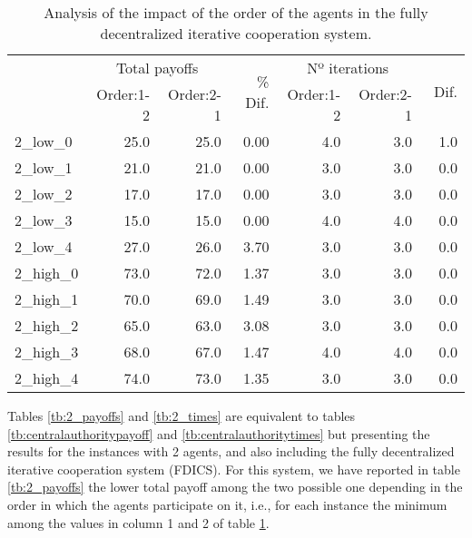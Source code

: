 \documentclass{article}
\begin{document}
\begin{table}[ht!]
\centering
\caption{Analysis of the impact of the order of the agents in the fully decentralized iterative cooperation system. \label{tb:iter_order_comparition}}
\begin{adjustbox}{max width=\textwidth}
\begin{tabular}{lrrrrrr}
\toprule
{} & \multicolumn{2}{c}{Total payoffs} & \multirow{2}{*}{\% Dif.} & \multicolumn{2}{c}{Nº iterations} & \multirow{2}{*}{\ Dif.} \\
{} &  Order:1-2 &  Order:2-1 &       &  Order:1-2 &  Order:2-1 & \\
\midrule
2\_low\_0  &           25.0 &           25.0 &  0.00 &        4.0 &        3.0 &     1.0 \\
2\_low\_1  &           21.0 &           21.0 &  0.00 &        3.0 &        3.0 &     0.0 \\
2\_low\_2  &           17.0 &           17.0 &  0.00 &        3.0 &        3.0 &     0.0 \\
2\_low\_3  &           15.0 &           15.0 &  0.00 &        4.0 &        4.0 &     0.0 \\
2\_low\_4  &           27.0 &           26.0 &  3.70 &        3.0 &        3.0 &     0.0 \\
2\_high\_0 &           73.0 &           72.0 &  1.37 &        3.0 &        3.0 &     0.0 \\
2\_high\_1 &           70.0 &           69.0 &  1.49 &        3.0 &        3.0 &     0.0 \\
2\_high\_2 &           65.0 &           63.0 &  3.08 &        3.0 &        3.0 &     0.0 \\
2\_high\_3 &           68.0 &           67.0 &  1.47 &        4.0 &        4.0 &     0.0 \\
2\_high\_4 &           74.0 &           73.0 &  1.35 &        3.0 &        3.0 &     0.0 \\
\bottomrule
\end{tabular}
\end{adjustbox}
\end{table}


Tables \ref{tb:2_payoffs} and \ref{tb:2_times} are equivalent to tables \ref{tb:centralauthoritypayoff} and \ref{tb:centralauthoritytimes} but presenting the results for the instances with 2 agents, and also including the fully decentralized iterative cooperation system (FDICS). For this system, we have reported in table \ref{tb:2_payoffs} the lower total payoff among the two possible one depending in the order in which the agents participate on it, i.e., for each instance the minimum among the values in column 1 and 2 of table \ref{tb:iter_order_comparition}.
\end{document}
